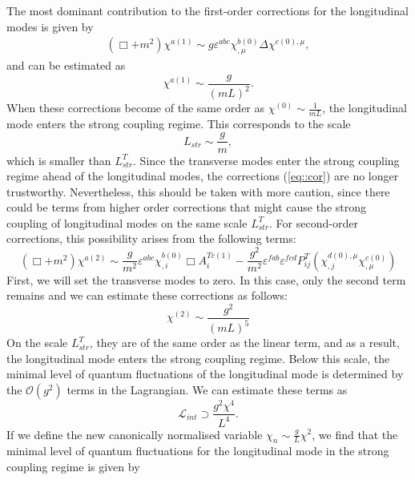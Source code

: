 \documentclass{article}
\begin{document}
The most dominant contribution to the first-order corrections for the longitudinal modes is given by 
\begin{equation}
    \begin{split}
        (\Box+m^2)\chi^{a(1)}\sim g\varepsilon^{abc}\chi^{b(0)}_{,\mu}\Delta\chi^{c(0),\mu},
    \end{split}
\end{equation}
and can be estimated as
\begin{equation}\label{eq::cor}
    \chi^{a(1)}\sim\frac{g}{(mL)^2}.
\end{equation}
When these corrections become of the same order as $\chi^{(0)}\sim\frac{1}{mL}$, the longitudinal mode enters the strong coupling regime. This corresponds to the scale
\begin{equation}
    L_{str}\sim\frac{g}{m},
\end{equation}
which is smaller than $L_{str}^T$. Since the transverse modes enter the strong coupling regime ahead of the longitudinal modes, the corrections (\ref{eq::cor}) are no longer trustworthy. Nevertheless, this should be taken with more caution, since there could be terms from higher order corrections that might cause the strong coupling of longitudinal modes on the same scale $L_{str}^T$. For second-order corrections, this possibility arises from the following terms:
\begin{equation}\label{eq::longCor}
    (\Box+m^2)\chi^{a(2)}\sim \frac{g}{m^2}\varepsilon^{abc}\chi^{b(0)}_{,i}\Box A_i^{Tc(1)}-\frac{g^2}{m^2}\varepsilon^{fab}\varepsilon^{fcd}P^T_{ij}\left(\chi^{d(0),\mu}_{,j}\chi^{c(0)}_{,\mu}\right)
\end{equation}
First, we will set the transverse modes to zero. In this case, only the second term remains and we can estimate these corrections as follows:
\begin{equation}
    \chi^{(2)}\sim\frac{g^2}{\left(mL\right)^5}
\end{equation}
On the scale $L^T_{str}$, they are of the same order as the linear term, and as a result, the longitudinal mode enters the strong coupling regime. 
Below this scale, the minimal level of quantum fluctuations of the longitudinal mode is determined by the $\mathcal{O}\left(g^2\right)$ terms in the Lagrangian. We can estimate these terms as 
\begin{equation}
\mathcal{L}_{int}\supset\frac{g^2\chi^4}{L^4}.
\end{equation}
If we define the new canonically normalised variable $\chi_n\sim \frac{g}{L}\chi^2$, we find that the minimal level of quantum fluctuations for the longitudinal mode in the strong coupling regime is given by 
\end{document}
